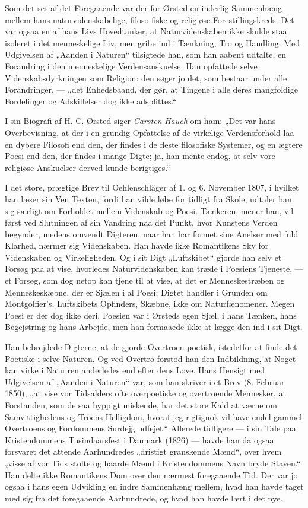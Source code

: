 \documentclass[12pt,a4paper,openany]{book}
\newcommand{\opage}[1]{\marginnote{\footnotesize\textit{[#1]}}}
\begin{document}
Som det ses af det Foregaaende var der for Ørsted en inderlig Sammenhæng mellem
hans naturvidenskabelige, filoso%
\setcounter{footnote}{0}%
\opage{54}fiske og religiøse Forestillingskreds. Det var ogsaa en af hans Livs
Hovedtanker, at Naturvidenskaben ikke skulde staa isoleret i det menneskelige
Liv, men gribe ind i Tænkning, Tro og Handling. Med Udgivelsen af „Aanden i
Naturen“ tilsigtede han, som han aabent udtalte, en Forandring i den
menneskelige Verdensanskuelse. Han opfattede selve Videnskabsdyrkningen som
Religion: den søger jo det, som bestaar under alle Forandringer, --- „det
Enhedsbaand, der gør, at Tingene i alle deres mangfoldige Fordelinger og
Adskillelser dog ikke adsplittes.“

I sin Biografi af H. C. Ørsted siger \emph{Carsten} \emph{Hauch} om ham: „Det
var hans Overbevisning, at der i en grundig Opfattelse af de virkelige
Verdensforhold laa en dybere Filosofi end den, der findes i de fleste
filosofiske Systemer, og en ægtere Poesi end den, der findes i mange Digte; ja,
han mente endog, at selv vore religiøse Anskuelser derved kunde berigtiges.“

I det store, prægtige Brev til Oehlenschläger af 1. og 6. November 1807, i
hvilket han læser sin Ven Texten, fordi han vilde løbe for tidligt fra Skole,
udtaler han sig særligt om Forholdet mellem Videnskab og Poesi. Tænkeren, mener
han, vil først ved Slutningen af sin Vandring naa det Punkt, hvor Kunstens
Verden begynder, medens omvendt Digteren, naar han har formet sine Anelser med
fuld Klarhed, nærmer sig Videnskaben. Han havde ikke Romantikens Sky for
Videnskaben og Virkeligheden. Og i sit Digt „Luftskibet“ gjorde han selv et
Forsøg paa at vise, hvorledes Naturvidenskaben kan træde i Poesiens Tjeneste,
--- et Forsøg, som dog netop kan tjene til at vise, at det er Menneskestræben
og Menneskeskæbne, der er Sjælen i al Poesi: Digtet handler i Grunden om
Montgolfier's, Luftskibets Opfinders, Skæbne, ikke om Naturfænomener. Megen
Poesi er der dog ikke deri. Poesien var i Ørsteds egen Sjæl, i hans Tænken,
hans Begejstring og hans Arbejde, men han formaaede ikke at lægge den ind i sit Digt.

Han bebrejdede Digterne, at de gjorde Overtroen poetisk, istedetfor at finde
det Poetiske i selve Naturen. Og ved Overtro forstod han den Indbildning, at
Noget kan virke i Natu%
\setcounter{footnote}{0}%
\opage{55}ren anderledes end efter dens Love. Hans Hensigt med Udgivelsen af
„Aanden i Naturen“ var, som han skriver i et Brev (8. Februar 1850), „at vise
vor Tidsalders ofte overpoetiske og overtroende Mennesker, at Forstanden, som
de saa hyppigt miskende, har det store Kald at værne om Samvittighedens og
Troens Helligdom, hvoraf jeg rigtignok vil have endel gammel Overtroens og
Fordommens Surdejg udfejet.“ Allerede tidligere --- i sin Tale paa
Kristendommens Tusindaarsfest i Danmark (1826) --- havde han da ogsaa forsvaret
det attende Aarhundredes „dristigt granskende Mænd“, over hvem „visse af vor
Tids stolte og haarde Mænd i Kristendommens Navn bryde Staven.“ Han delte ikke
Romantikens Dom over den nærmest foregaaende Tid. Der var jo ogsaa i hans egen
Udvikling en indre Sammenhæng mellem, hvad han havde taget med sig fra det
foregaaende Aarhundrede, og hvad han havde lært i det nye.
\end{document}
